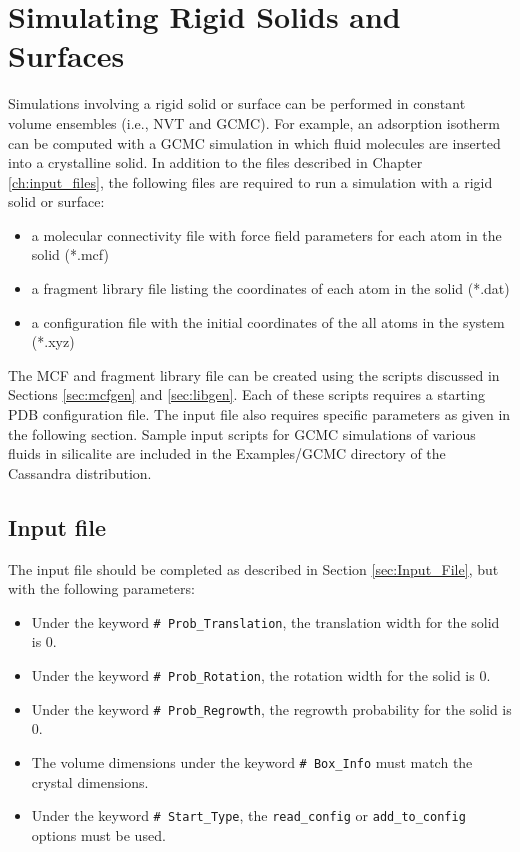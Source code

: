 \chapter{Simulating Rigid Solids and Surfaces}

Simulations involving a rigid solid or surface can be performed in constant volume ensembles
(i.e., NVT and GCMC). 
For example, an adsorption isotherm can be computed with a GCMC simulation in which fluid molecules
are inserted into a crystalline solid.
In addition to the files described in Chapter \ref{ch:input_files}, 
the following files are required to run a simulation with a rigid solid or surface:

\begin{itemize}
\item a molecular connectivity file with force field parameters for each atom in the solid (*.mcf)
\item a fragment library file listing the coordinates of each atom in the solid (*.dat)
\item a configuration file with the initial coordinates of the all atoms in the system (*.xyz) 
\end{itemize} 

The MCF and fragment library file can be created using the scripts discussed in Sections \ref{sec:mcfgen} and \ref{sec:libgen}. 
Each of these scripts requires a starting PDB configuration file.
The input file also requires specific parameters as given in the following section. Sample input scripts for GCMC simulations
of various fluids in silicalite are included in the Examples/GCMC directory of the Cassandra distribution.
 
\section{Input file}
The input file should be completed as described in Section \ref{sec:Input_File}, but with the following parameters:

\begin{itemize}
	\item Under the keyword \texttt{\# Prob\_Translation}, the translation width for the solid is 0.
	\item Under the keyword \texttt{\# Prob\_Rotation}, the rotation width for the solid is 0.
	\item Under the keyword \texttt{\# Prob\_Regrowth}, the regrowth probability for the solid is 0.
	\item The volume dimensions under the keyword \texttt{\# Box\_Info} must match the crystal dimensions.
	\item Under the keyword \texttt{\# Start\_Type}, the \texttt{read\_config} or \texttt{add\_to\_config} options must be used.
\end{itemize}

